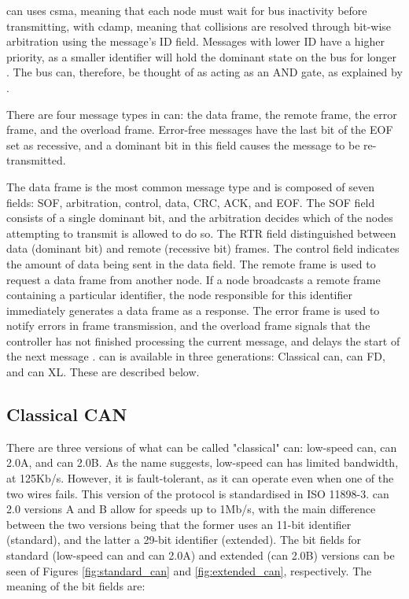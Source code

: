 \gls{can} uses \gls{csma}, meaning that each node must wait for bus inactivity before transmitting, with \gls{cdamp}, meaning that collisions are resolved through bit-wise arbitration using the message's ID field. Messages with lower ID have a higher priority, as a smaller identifier will hold the dominant state on the bus for longer \citep{Corrigan2002}. The bus can, therefore, be thought of as acting as an AND gate, as explained by \cite{Cook2008}.\par

There are four message types in \gls{can}: the data frame, the remote frame, the error frame, and the overload frame. Error-free messages have the last bit of the EOF set as recessive, and a dominant bit in this field causes the message to be re-transmitted.\par

The data frame is the most common message type and is composed of seven fields: SOF, arbitration, control, data, CRC, ACK, and EOF. The SOF field consists of a single dominant bit, and the arbitration decides which of the nodes attempting to transmit is allowed to do so. The RTR field distinguished between data (dominant bit) and remote (recessive bit) frames. The control field indicates the amount of data being sent in the data field. The remote frame is used to request a data frame from another node. If a node broadcasts a remote frame containing a particular identifier, the node responsible for this identifier immediately generates a data frame as a response. The error frame is used to notify errors in frame transmission, and the overload frame signals that the controller has not finished processing the current message, and delays the start of the next message \citep{lee2017otids}.
\gls{can} is available in three generations: Classical \gls{can}, \gls{can} FD, and \gls{can} XL. These are described below.

\subsection{Classical CAN}

There are three versions of what can be called "classical" \gls{can}: low-speed \gls{can}, \gls{can} 2.0A, and \gls{can} 2.0B. As the name suggests, low-speed \gls{can} has limited bandwidth, at 125Kb/s. However, it is fault-tolerant, as it can operate even when one of the two wires fails. This version of the protocol is standardised in ISO 11898-3. \gls{can} 2.0 versions A and B allow for speeds up to 1Mb/s, with the main difference between the two versions being that the former uses an 11-bit identifier (standard), and the latter a 29-bit identifier (extended). The bit fields for standard (low-speed \gls{can} and \gls{can} 2.0A) and extended (\gls{can} 2.0B) versions can be seen of Figures \ref{fig:standard_can} and \ref{fig:extended_can}, respectively. The meaning of the bit fields are:

